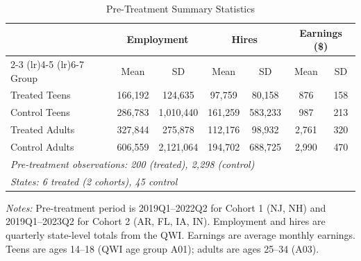 \begin{table}[htbp]
\centering
\caption{Pre-Treatment Summary Statistics}
\label{tab:summary}
\begin{threeparttable}
\begin{tabular}{lcccccc}
\toprule
 & \multicolumn{2}{c}{Employment} & \multicolumn{2}{c}{Hires} & \multicolumn{2}{c}{Earnings (\$)} \\
\cmidrule(lr){2-3} \cmidrule(lr){4-5} \cmidrule(lr){6-7}
Group & Mean & SD & Mean & SD & Mean & SD \\
\midrule
Treated Teens & 166,192 & 124,635 & 97,759 & 80,158 & 876 & 158 \\
Control Teens & 286,783 & 1,010,440 & 161,259 & 583,233 & 987 & 213 \\
Treated Adults & 327,844 & 275,878 & 112,176 & 98,932 & 2,761 & 320 \\
Control Adults & 606,559 & 2,121,064 & 194,702 & 688,725 & 2,990 & 470 \\
\midrule
\multicolumn{7}{l}{\textit{Pre-treatment observations: 200 (treated), 2,298 (control)}} \\
\multicolumn{7}{l}{\textit{States: 6 treated (2 cohorts), 45 control}} \\
\bottomrule
\end{tabular}
\begin{tablenotes}[flushleft]
\small
\item \textit{Notes:} Pre-treatment period is 2019Q1--2022Q2 for Cohort 1 (NJ, NH) and 2019Q1--2023Q2 for Cohort 2 (AR, FL, IA, IN). Employment and hires are quarterly state-level totals from the QWI. Earnings are average monthly earnings. Teens are ages 14--18 (QWI age group A01); adults are ages 25--34 (A03).
\end{tablenotes}
\end{threeparttable}
\end{table}
